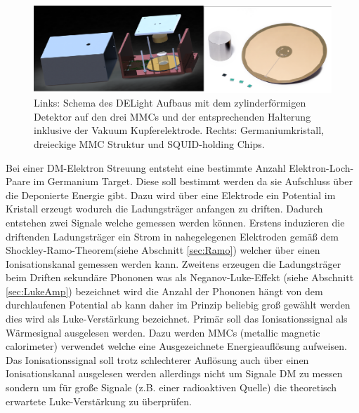 \begin{figure}[!t]
\begin{center}
\includegraphics[scale=1]{./fig/Antrag-DELight-extract.pdf}
\vspace{-0.5cm}
\caption{Links: Schema des DELight Aufbaus mit dem zylinderförmigen Detektor auf den drei MMCs und der entsprechenden Halterung inklusive der Vakuum Kupferelektrode. Rechts: Germaniumkristall, dreieckige MMC Struktur und SQUID-holding Chips.}
\label{fig:DELightAufbau}
\end{center}
\end{figure}

Bei einer DM-Elektron Streuung entsteht eine bestimmte Anzahl Elektron-Loch-Paare im Germanium Target.
Diese soll bestimmt werden da sie Aufschluss über die Deponierte Energie gibt.
Dazu wird über eine Elektrode ein Potential im Kristall erzeugt wodurch die Ladungsträger anfangen zu driften.
Dadurch entstehen zwei Signale welche gemessen werden können.
Erstens induzieren die driftenden Ladungsträger ein Strom in nahegelegenen Elektroden gemäß dem Shockley-Ramo-Theorem\cite{Ramo1939}(siehe Abschnitt \ref{sec:Ramo}) welcher über einen Ionisationskanal gemessen werden kann.
Zweitens erzeugen die Ladungsträger beim Driften sekundäre Phononen was als Neganov-Luke-Effekt\cite{Luke1988} (siehe Abschnitt \ref{sec:LukeAmp}) bezeichnet wird die Anzahl der Phononen hängt von dem durchlaufenen Potential ab kann daher im Prinzip beliebig groß gewählt werden dies wird als Luke-Verstärkung bezeichnet.
Primär soll das Ionisationssignal als Wärmesignal ausgelesen werden.
Dazu werden  MMCs\cite{Fleischmann2009, Enss2005} (metallic magnetic calorimeter) verwendet welche eine Ausgezeichnete Energieauflösung aufweisen.
Das Ionisationssignal soll trotz schlechterer Auflösung auch über einen Ionisationskanal ausgelesen werden allerdings nicht um Signale DM zu messen sondern um für große Signale (z.B. einer radioaktiven Quelle) die theoretisch erwartete Luke-Verstärkung zu überprüfen.

